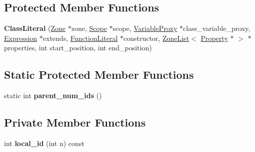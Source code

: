 \subsection*{Protected Member Functions}
\begin{DoxyCompactItemize}
\item 
{\bfseries Class\+Literal} (\hyperlink{classv8_1_1internal_1_1_zone}{Zone} $\ast$zone, \hyperlink{classv8_1_1internal_1_1_scope}{Scope} $\ast$scope, \hyperlink{classv8_1_1internal_1_1_variable_proxy}{Variable\+Proxy} $\ast$class\+\_\+variable\+\_\+proxy, \hyperlink{classv8_1_1internal_1_1_expression}{Expression} $\ast$extends, \hyperlink{classv8_1_1internal_1_1_function_literal}{Function\+Literal} $\ast$constructor, \hyperlink{classv8_1_1internal_1_1_zone_list}{Zone\+List}$<$ \hyperlink{classv8_1_1internal_1_1_object_literal_property}{Property} $\ast$ $>$ $\ast$properties, int start\+\_\+position, int end\+\_\+position)\hypertarget{classv8_1_1internal_1_1_class_literal_a31334b1b0adca5b1f4f26ab55cd1a071}{}\label{classv8_1_1internal_1_1_class_literal_a31334b1b0adca5b1f4f26ab55cd1a071}

\end{DoxyCompactItemize}
\subsection*{Static Protected Member Functions}
\begin{DoxyCompactItemize}
\item 
static int {\bfseries parent\+\_\+num\+\_\+ids} ()\hypertarget{classv8_1_1internal_1_1_class_literal_ad22493d73502e489d8c2e356ba83f00a}{}\label{classv8_1_1internal_1_1_class_literal_ad22493d73502e489d8c2e356ba83f00a}

\end{DoxyCompactItemize}
\subsection*{Private Member Functions}
\begin{DoxyCompactItemize}
\item 
int {\bfseries local\+\_\+id} (int n) const \hypertarget{classv8_1_1internal_1_1_class_literal_a34ced8711fbc295c033aeb019f6998bc}{}\label{classv8_1_1internal_1_1_class_literal_a34ced8711fbc295c033aeb019f6998bc}

\end{DoxyCompactItemize}
